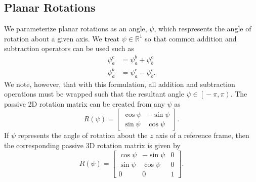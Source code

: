 
\subsection{Planar Rotations}
\label{sec:planar_rotations}

We parameterize planar rotations as an angle, $\psi$, which respresents
the angle of rotation about a given axis.
We treat $\psi \in \mathbb{R}^1$ so that common addition and subtraction
operators can be used such as
\begin{align}
  \psi_a^c &= \psi_a^b + \psi_b^c \\
  \psi_a^b &= \psi_a^c - \psi_b^c.
\end{align}
We note, however, that with this formulation, all addition and subtraction
operations must be wrapped such
that the resultant angle $\psi \in \left[ \right. -\pi, \pi \left. \right)$. The
passive 2D
rotation matrix can be created from any $\psi$ as
\begin{equation}
  R \left( \psi \right) = \begin{bmatrix} \cos \psi & -\sin \psi \\ \sin \psi &
  \cos \psi \end{bmatrix}.
\end{equation}
If $\psi$ represents the angle of rotation about the $z$ axis of a reference frame, then
the corresponding passive 3D rotation matrix is given by
\begin{equation}
  R \left( \psi \right) = \begin{bmatrix}
    \cos \psi & -\sin \psi & 0 \\
    \sin \psi & \cos \psi & 0 \\
    0 & 0 & 1
  \end{bmatrix}.
\end{equation}

